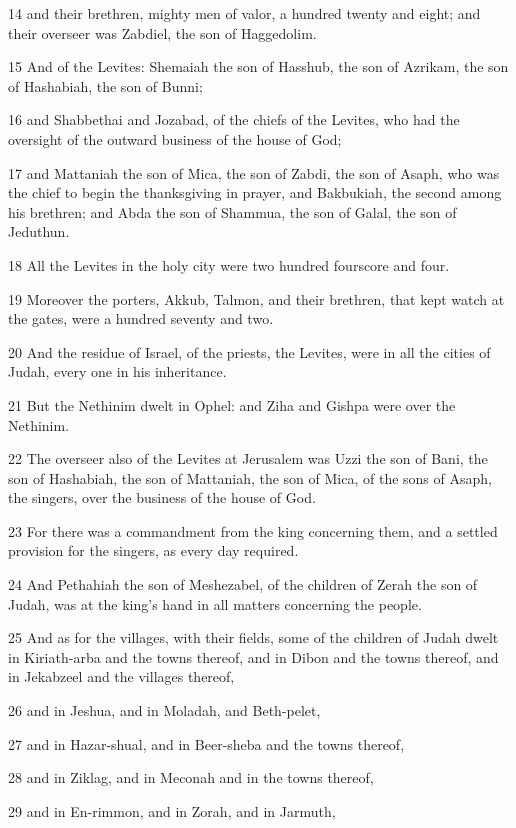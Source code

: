 \par 14 and their brethren, mighty men of valor, a hundred twenty and eight; and their overseer was Zabdiel, the son of Haggedolim.
\par 15 And of the Levites: Shemaiah the son of Hasshub, the son of Azrikam, the son of Hashabiah, the son of Bunni;
\par 16 and Shabbethai and Jozabad, of the chiefs of the Levites, who had the oversight of the outward business of the house of God;
\par 17 and Mattaniah the son of Mica, the son of Zabdi, the son of Asaph, who was the chief to begin the thanksgiving in prayer, and Bakbukiah, the second among his brethren; and Abda the son of Shammua, the son of Galal, the son of Jeduthun.
\par 18 All the Levites in the holy city were two hundred fourscore and four.
\par 19 Moreover the porters, Akkub, Talmon, and their brethren, that kept watch at the gates, were a hundred seventy and two.
\par 20 And the residue of Israel, of the priests, the Levites, were in all the cities of Judah, every one in his inheritance.
\par 21 But the Nethinim dwelt in Ophel: and Ziha and Gishpa were over the Nethinim.
\par 22 The overseer also of the Levites at Jerusalem was Uzzi the son of Bani, the son of Hashabiah, the son of Mattaniah, the son of Mica, of the sons of Asaph, the singers, over the business of the house of God.
\par 23 For there was a commandment from the king concerning them, and a settled provision for the singers, as every day required.
\par 24 And Pethahiah the son of Meshezabel, of the children of Zerah the son of Judah, was at the king's hand in all matters concerning the people.
\par 25 And as for the villages, with their fields, some of the children of Judah dwelt in Kiriath-arba and the towns thereof, and in Dibon and the towns thereof, and in Jekabzeel and the villages thereof,
\par 26 and in Jeshua, and in Moladah, and Beth-pelet,
\par 27 and in Hazar-shual, and in Beer-sheba and the towns thereof,
\par 28 and in Ziklag, and in Meconah and in the towns thereof,
\par 29 and in En-rimmon, and in Zorah, and in Jarmuth,
